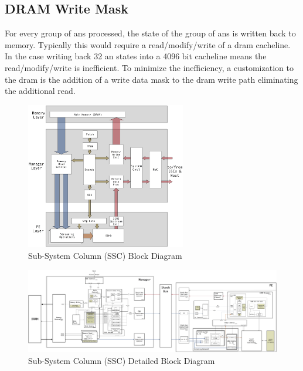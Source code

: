 \documentclass[journal]{IEEEtran}
\begin{document}
\subsection{DRAM Write Mask}
\label{sec:DRAMWriteMask}
For every group of \acp{an} processed, the state of the group of \acp{an} is written back to memory.
Typically this would require a read/modify/write of a \ac{dram} cacheline. In the case writing back 32 \ac{an} states into a 4096 bit cacheline means the read/modify/write is inefficient.
To minimize the inefficiency, a customization to the \ac{dram} is the addition of a write data mask to the \ac{dram} write path eliminating the additional read.


%
%
\iftrue

\begin{figure}[!t]
\centering
\captionsetup{justification=centering}
\captionsetup{width=.9\linewidth}
\centerline{
\mbox{\includegraphics[width=2.75in]{DetailedFlowDiagram.jpg}}
}
\center\caption{Sub-System Column (SSC) Block Diagram}
\label{fig:DetailedFlowDiagram}
\end{figure}

\fi

\iffalse

\begin{figure}[!t]
\centering
\captionsetup{justification=centering}
\centerline{
\mbox{\includegraphics[width=6.0in]{DetailedBlockDiagram.jpg}}
}
\center\caption{Sub-System Column (SSC) Detailed Block Diagram}
\label{fig:DetailedBlockDiagram}
\end{figure}
\end{document}
